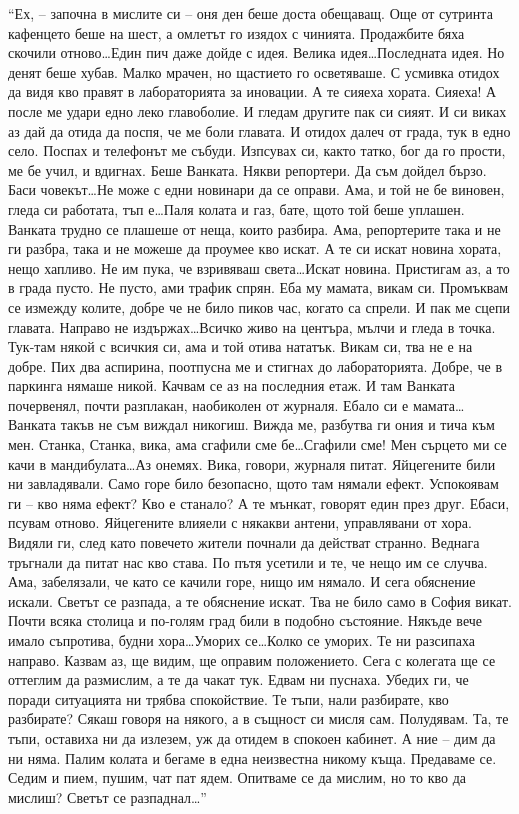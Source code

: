 \documentclass[ebook,openany,12pt]{memoir}
\begin{document}
``Ех, -- започна в мислите си – оня ден беше доста обещаващ. Още от сутринта кафенцето беше на шест, а омлетът го изядох с чинията. Продажбите бяха скочили отново\ldots Един пич даже дойде с идея. Велика идея\ldots По\-следната идея. Но денят беше хубав. Малко мрачен, но щастието го осветяваше. С усмивка отидох да видя кво правят в лабораторията за иновации. А те сияеха хората. Сияеха! А после ме удари едно леко главоболие. И гледам другите пак си сияят. И си виках аз дай да отида да поспя, че ме боли главата. И отидох далеч от града, тук в едно село. Поспах и телефонът ме събуди. Изпсувах си, както татко, бог да го прости, ме бе учил, и вдигнах. Беше Ванката. Някви репортери. Да съм дойдел бързо. Баси човекът\ldots Не може с едни новинари да се оправи. Ама, и той не бе виновен, гледа си работата, тъп е\ldots Паля колата и газ, бате, щото той беше уплашен. Ванката трудно се плашеше от неща, които разбира. Ама, репортерите така и не ги разбра, така и не можеше да проумее кво искат. А те си искат новина хората, нещо хапливо. Не им пука, че взривяваш света\ldots Искат новина. Пристигам аз, а то в града пусто. Не пусто, ами трафик спрян. Еба му мамата, викам си. Промъквам се измежду колите, добре че не било пиков час, когато са спрели. И пак ме сцепи главата. Направо не издържах\ldots Всичко живо на центъра, мълчи и гледа в точка. Тук-там някой с всичкия си, ама и той отива нататък. Викам си, тва не е на добре. Пих два аспирина, поотпусна ме и стигнах до лабораторията. Добре, че в паркинга нямаше никой. Качвам се аз на последния етаж. И там Ванката почервенял, почти разплакан, наобиколен от журналя. Ебало си е мамата\ldots Ванката такъв не съм виждал никогиш. Вижда ме, разбутва ги ония и тича към мен. Станка, Станка, вика, ама сгафили сме бе\ldots Сгафили сме! Мен сърцето ми се качи в мандибулата\ldots Аз онемях. Вика, говори, журналя питат. Яйцегените били ни завладявали. Само горе било безопасно, щото там нямали ефект. Успокоявам ги – кво няма ефект? Кво е станало? А те мънкат, говорят един през друг. Ебаси, псувам отново. Яйцегените влияели с някакви антени, управлявани от хора. Видяли ги, след като повечето жители почнали да действат странно. Веднага тръгнали да питат нас кво става. По пътя усетили и те, че нещо им се случва. Ама, забелязали, че като се качили горе, нищо им нямало. И сега обяснение искали. Светът се разпада, а те обяснение искат. Тва не било само в София викат. Почти всяка столица и по-голям град били в подобно състояние. Някъде вече имало съпротива, будни хора\ldots Уморих се\ldots Колко се уморих. Те ни разсипаха направо. Казвам аз, ще видим, ще оправим положението. Сега с колегата ще се оттеглим да размислим, а те да чакат тук. Едвам ни пуснаха. Убедих ги, че поради ситуацията ни трябва спокойствие. Те тъпи, нали разбирате, кво разбирате? Сякаш говоря на някого, а в същност си мисля сам. Полудявам. Та, те тъпи, оставиха ни да излезем, уж да отидем в спокоен кабинет. А ние -- дим да ни няма. Палим колата и бегаме в една неизвестна никому къща. Предаваме се. Седим и пием, пушим, чат пат ядем. Опитваме се да мислим, но то кво да мислиш? Светът се разпаднал\ldots''
\end{document}
